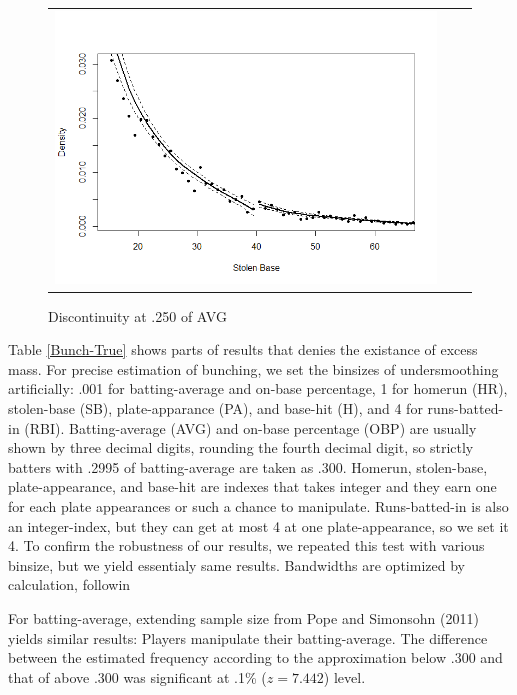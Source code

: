 \documentclass[dvipdfmx, 12pt]{article}
\begin{document}
\begin{figure}
\begin{tabular}{ccc}
          \multicolumn{1}{r}{
          \begin{minipage}{.4\textwidth}
            \includegraphics[keepaspectratio, scale = 0.5, angle = 0]{graphs/SB_40.png}
            \caption{Discontinuity at .250 of AVG}
            \label{DCdensity_SB_40}
          \end{minipage}
          }
        \end{tabular}
      \end{figure}

Table \ref{Bunch-True} shows parts of results that denies the existance of excess mass. For precise estimation of bunching, we set the binsizes of undersmoothing artificially: .001 for batting-average and on-base percentage, 1 for homerun (HR), stolen-base (SB), plate-apparance (PA), and base-hit (H), and 4 for runs-batted-in (RBI). Batting-average (AVG) and on-base percentage (OBP) are usually shown by three decimal digits, rounding the fourth decimal digit, so strictly batters with .2995 of batting-average are taken as .300. Homerun, stolen-base, plate-appearance, and base-hit are indexes that takes integer and they earn one for each plate appearances or such a chance to manipulate. Runs-batted-in is also an integer-index, but they can get at most 4 at one plate-appearance, so we set it 4. To confirm the robustness of our results, we repeated this test with various binsize, but we yield essentialy same results. Bandwidths are optimized by calculation, followin

For batting-average, extending sample size from Pope and Simonsohn (2011) yields similar results: Players manipulate their batting-average. The difference between the estimated frequency according to the approximation below .300 and that of above .300 was significant at .1\% ($z=7.442$) level.
\end{document}
